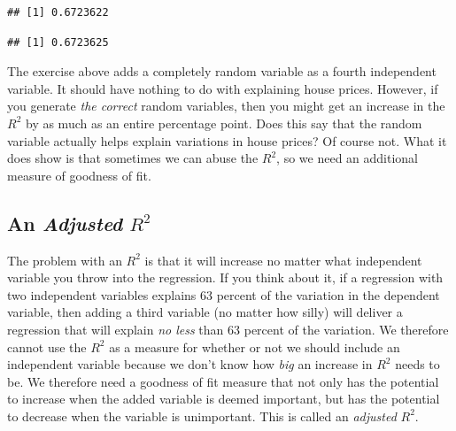 \documentclass[
]{book}
\newenvironment{Shaded}{\begin{snugshade}}{\end{snugshade}}
\newcommand{\AttributeTok}[1]{\textcolor[rgb]{0.77,0.63,0.00}{#1}}
\newcommand{\FunctionTok}[1]{\textcolor[rgb]{0.00,0.00,0.00}{#1}}
\newcommand{\NormalTok}[1]{#1}
\newcommand{\OtherTok}[1]{\textcolor[rgb]{0.56,0.35,0.01}{#1}}
\newcommand{\SpecialCharTok}[1]{\textcolor[rgb]{0.00,0.00,0.00}{#1}}
\begin{document}
\begin{Shaded}
\end{Shaded}

\begin{verbatim}
## [1] 0.6723622
\end{verbatim}

\begin{Shaded}
\end{Shaded}

\begin{verbatim}
## [1] 0.6723625
\end{verbatim}

The exercise above adds a completely random variable as a fourth independent variable. It should have nothing to do with explaining house prices. However, if you generate \emph{the correct} random variables, then you might get an increase in the \(R^2\) by as much as an entire percentage point. Does this say that the random variable actually helps explain variations in house prices? Of course not. What it does show is that sometimes we can abuse the \(R^2\), so we need an additional measure of goodness of fit.

\hypertarget{an-adjusted-r2}{%
\subsection{\texorpdfstring{An \emph{Adjusted} \(R^2\)}{An Adjusted R\^{}2}}\label{an-adjusted-r2}}

The problem with an \(R^2\) is that it will increase no matter what independent variable you throw into the regression. If you think about it, if a regression with two independent variables explains 63 percent of the variation in the dependent variable, then adding a third variable (no matter how silly) will deliver a regression that will explain \emph{no less} than 63 percent of the variation. We therefore cannot use the \(R^2\) as a measure for whether or not we should include an independent variable because we don't know how \emph{big} an increase in \(R^2\) needs to be. We therefore need a goodness of fit measure that not only has the potential to increase when the added variable is deemed important, but has the potential to decrease when the variable is unimportant. This is called an \emph{adjusted} \(R^2\).
\end{document}
